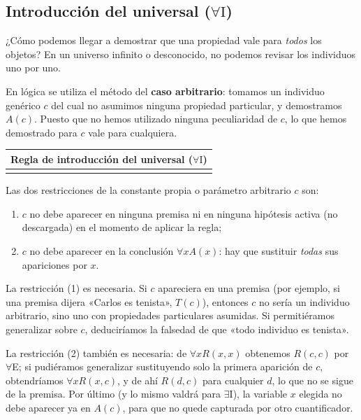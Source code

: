 \subsection{Introducción del universal \texorpdfstring{($\forall\text{I}$)}{(Introduccion del universal)}}\label{sec:forall-i}

¿Cómo podemos llegar a demostrar que una propiedad vale para \emph{todos} los objetos? En un universo infinito o desconocido, no podemos revisar los individuos uno por uno.

En lógica se utiliza el método del \textbf{caso arbitrario}: tomamos
un individuo genérico $c$ del cual no asumimos ninguna propiedad
particular, y demostramos $A(c)$. Puesto que no hemos
utilizado ninguna peculiaridad de $c$, lo que hemos demostrado para
$c$ vale para cualquiera. 

\begin{center}
\begin{tabular}{|c|}
\hline
\textbf{Regla de introducción del universal ($\forall\text{I}$)} \\
\hline
\cajaregla{$\begin{nd}[rules=myrules]
    \have [m] {1} {A(c)} \by{}{}
    \have [\mbox{}] {2} {\forall x A(x)} \Ai{1}
\end{nd}$} \\
\hline
\end{tabular}
\end{center}

\noindent Las dos restricciones de la constante propia o parámetro arbitrario $c$ son:
\begin{enumerate}[(1)]
    \item $c$ no debe aparecer en ninguna premisa ni en ninguna hipótesis activa (no descargada) en el momento de aplicar la regla;
    \item $c$ no debe aparecer en la conclusión $\forall x A(x)$: hay que sustituir \emph{todas} sus apariciones por $x$.
\end{enumerate}
La restricción (1) es necesaria. Si $c$ apareciera en una premisa
(por ejemplo, si una premisa dijera «Carlos es tenista», $T(c)$), entonces $c$ no sería un individuo arbitrario, sino uno con propiedades particulares asumidas. Si permitiéramos generalizar sobre $c$, deduciríamos la falsedad de que «todo individuo es tenista».

La restricción (2) también es necesaria: de $\forall x R(x, x)$ obtenemos $R(c, c)$ por $\forall$E; si pudiéramos generalizar sustituyendo solo la primera aparición de $c$, obtendríamos $\forall x R(x, c)$, y de ahí $R(d, c)$ para cualquier $d$, lo que no se sigue de la premisa. Por último (y lo mismo valdrá para $\exists$I), la variable $x$ elegida no debe aparecer ya en $A(c)$, para que no quede capturada por otro cuantificador.


